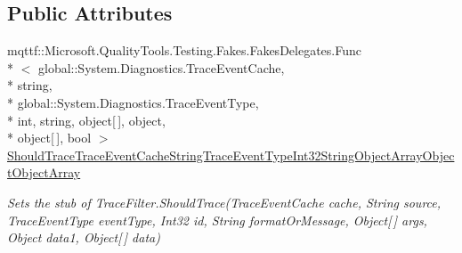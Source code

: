 \subsection*{Public Attributes}
\begin{DoxyCompactItemize}
\item 
mqttf\-::\-Microsoft.\-Quality\-Tools.\-Testing.\-Fakes.\-Fakes\-Delegates.\-Func\\*
$<$ global\-::\-System.\-Diagnostics.\-Trace\-Event\-Cache, \\*
string, \\*
global\-::\-System.\-Diagnostics.\-Trace\-Event\-Type, \\*
int, string, object\mbox{[}$\,$\mbox{]}, object, \\*
object\mbox{[}$\,$\mbox{]}, bool $>$ \hyperlink{class_system_1_1_diagnostics_1_1_fakes_1_1_stub_trace_filter_a5b3c9e3c07461ff804f813bc5b460659}{Should\-Trace\-Trace\-Event\-Cache\-String\-Trace\-Event\-Type\-Int32\-String\-Object\-Array\-Object\-Object\-Array}
\begin{DoxyCompactList}\small\item\em Sets the stub of Trace\-Filter.\-Should\-Trace(\-Trace\-Event\-Cache cache, String source, Trace\-Event\-Type event\-Type, Int32 id, String format\-Or\-Message, Object\mbox{[}$\,$\mbox{]} args, Object data1, Object\mbox{[}$\,$\mbox{]} data)\end{DoxyCompactList}\end{DoxyCompactItemize}
